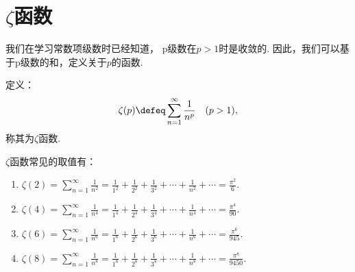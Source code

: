\section{\texorpdfstring{\(\zeta\)}{\textzeta}函数}
我们在学习常数项级数时已经知道，
p级数在\(p>1\)时是收敛的.
因此，我们可以基于p级数的和，定义关于\(p\)的函数.
\begin{definition}
定义：\[
	\zeta(p)
	\defeq
	\sum_{n=1}^\infty \frac{1}{n^p}
	\quad(p>1),
\]
称其为\(\zeta\)函数.
\end{definition}

\begin{proposition}
\def\zetafunc#1{\zeta(#1)%
	= \sum_{n=1}^\infty \frac{1}{n^{#1}}%
	= \frac{1}{1^{#1}}%
		+\frac{1}{2^{#1}}%
		+\frac{1}{3^{#1}}%
		+\dotsb%
		+\frac{1}{n^{#1}}%
		+\dotsb}%
\(\zeta\)函数常见的取值有：\begin{enumerate}
	\item \(\zetafunc{2} = \frac{\pi^2}{6}\).
	\item \(\zetafunc{4} = \frac{\pi^4}{90}\).
	\item \(\zetafunc{6} = \frac{\pi^6}{945}\).
	\item \(\zetafunc{8} = \frac{\pi^8}{9450}\).
\end{enumerate}
\end{proposition}
